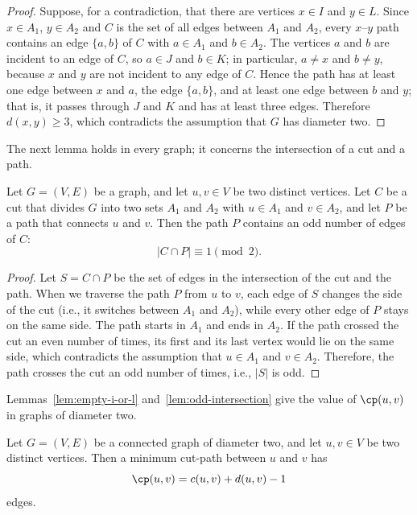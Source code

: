 \begin{proof}
Suppose, for a contradiction, that there are vertices $x \in I$ and $y \in L$.
Since $x \in A_1$, $y \in A_2$ and $C$ is the set of all edges between $A_1$ and $A_2$, every $x$--$y$ path contains an edge $\{a, b\}$ of $C$ with $a \in A_1$ and $b \in A_2$.
The vertices $a$ and $b$ are incident to an edge of $C$, so $a \in J$ and $b \in K$; in particular, $a \neq x$ and $b \neq y$, because $x$ and $y$ are not incident to any edge of $C$.
Hence the path has at least one edge between $x$ and $a$, the edge $\{a, b\}$, and at least one edge between $b$ and $y$; that is, it passes through $J$ and $K$ and has at least three edges.
Therefore $d(x, y) \geq 3$, which contradicts the assumption that $G$ has diameter two.
\end{proof}

The next lemma holds in every graph; it concerns the intersection of a cut and a path.

\begin{lemma}
\label{lem:odd-intersection}
Let $G = (V, E)$ be a graph, and let $u, v \in V$ be two distinct vertices.
Let $C$ be a cut that divides $G$ into two sets $A_1$ and $A_2$ with $u \in A_1$ and $v \in A_2$, and let $P$ be a path that connects $u$ and $v$.
Then the path $P$ contains an odd number of edges of $C$:
\[
|C \cap P| \equiv 1 \pmod{2}.
\]
\end{lemma}

\begin{proof}
Let $S = C \cap P$ be the set of edges in the intersection of the cut and the path.
When we traverse the path $P$ from $u$ to $v$, each edge of $S$ changes the side of the cut (i.e., it switches between $A_1$ and $A_2$), while every other edge of $P$ stays on the same side.
The path starts in $A_1$ and ends in $A_2$.
If the path crossed the cut an even number of times, its first and its last vertex would lie on the same side, which contradicts the assumption that $u \in A_1$ and $v \in A_2$.
Therefore, the path crosses the cut an odd number of times, i.e., $|S|$ is odd.
\end{proof}

Lemmas~\ref{lem:empty-i-or-l} and~\ref{lem:odd-intersection} give the value of $\cp(u,v)$ in graphs of diameter two.

\begin{theorem}
\label{thm:diameter-two}
Let $G = (V, E)$ be a connected graph of diameter two, and let $u, v \in V$ be two distinct vertices.
Then a minimum cut-path between $u$ and $v$ has
\[
\cp(u, v) = c(u, v) + d(u, v) - 1
\]
edges.
\end{theorem}


